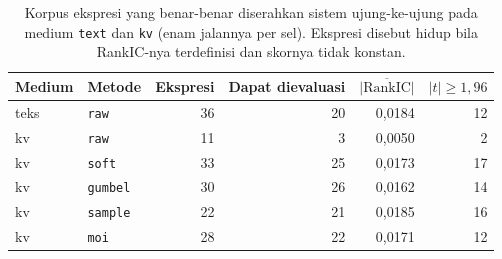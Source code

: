 \begin{table}[htbp]
\centering
\caption{Korpus ekspresi yang benar-benar diserahkan sistem ujung-ke-ujung pada medium \texttt{text} dan \texttt{kv} (enam jalannya per sel). Ekspresi disebut hidup bila RankIC-nya terdefinisi dan skornya tidak konstan.}
\label{tab:faktor-korpus}
\small
\begin{tabular}{llrrrr}
\hline
Medium & Metode & Ekspresi & Dapat dievaluasi & $\overline{|\text{RankIC}|}$ & $|t|\ge1{,}96$ \\
\hline
teks & \texttt{raw} & 36 & 20 & 0,0184 & 12 \\
kv & \texttt{raw} & 11 & 3 & 0,0050 & 2 \\
kv & \texttt{soft} & 33 & 25 & 0,0173 & 17 \\
kv & \texttt{gumbel} & 30 & 26 & 0,0162 & 14 \\
kv & \texttt{sample} & 22 & 21 & 0,0185 & 16 \\
kv & \texttt{moi} & 28 & 22 & 0,0171 & 12 \\
\hline
\end{tabular}
\end{table}
